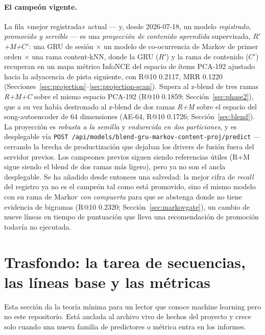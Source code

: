 \documentclass[11pt]{article}
\newcommand{\Rp}{\ensuremath{R'}}
\newcommand{\Cp}{\ensuremath{C'}}
\begin{document}
\paragraph{El campeón vigente.} La fila «mejor registrada» actual --- y, desde
2026-07-18, un modelo \emph{registrado, promovido y servible} --- es una
\emph{proyección de contenido aprendida} supervisada, \emph{\Rp+M+\Cp}: una GRU
de sesión $\times$ un modelo de co-ocurrencia de Markov de primer orden $\times$
una rama content-kNN, donde la GRU (\Rp) y la rama de contenido (\Cp) recuperan en
un mapa métrico InfoNCE del espacio de ítems PCA-192 ajustado hacia la adyacencia
de pista siguiente, con R@10 \num{0.2117}, MRR \num{0.1220}
(Secciones~\ref{sec:projection}--\ref{sec:projection-scan}). Supera al z-blend de
tres ramas \emph{R+M+C} sobre el mismo espacio PCA-192 (R@10 \num{0.1859};
Sección~\ref{sec:phase2}), que a su vez había destronado al z-blend de dos ramas
\emph{R+M} sobre el espacio del song-autoencoder de 64 dimensiones (AE-64, R@10
\num{0.1726}; Sección~\ref{sec:blend}). La proyección es \emph{robusta a la
semilla} y \emph{endurecida en dos particiones}, y es desplegable vía
\texttt{POST /api/models/blend-gru-markov-content-proj/predict} --- cerrando la
brecha de productización que dejaban los drivers de fusión fuera del servidor
previos. Los campeones previos siguen siendo referencias útiles (R+M sigue siendo
el blend de dos ramas más ligero), pero ya no son el ancla desplegable. Se ha
añadido desde entonces una salvedad: la mejor cifra de \emph{recall} del registro
ya no es el campeón tal como está promovido, sino el mismo modelo con su rama de
Markov \emph{con compuerta} para que se abstenga donde no tiene evidencia de
bigramas (R@10 \num{0.2320}; Sección~\ref{sec:markovgate}), un cambio de nueve
líneas en tiempo de puntuación que lleva una recomendación de promoción todavía no
ejecutada.

\section{Trasfondo: la tarea de secuencias, las líneas base y las métricas}
\label{sec:background}
Esta sección da la teoría mínima para un lector que conoce machine learning
pero no este repositorio. Está anclada al archivo vivo de hechos del proyecto y
crece solo cuando una nueva familia de predictores o métrica entra en los
informes.
\end{document}
